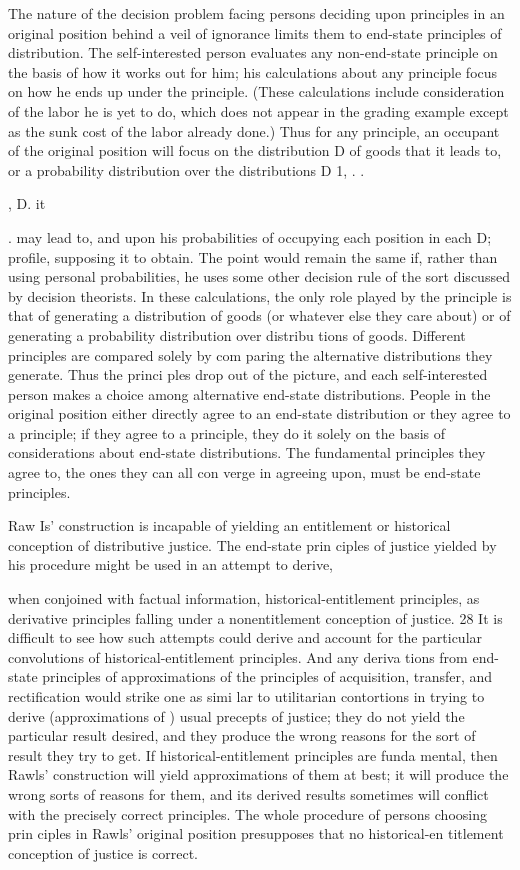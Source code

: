 \documentclass[11pt,openany]{book}
\begin{document}
The nature of the decision problem facing persons deciding upon principles in an original position behind a veil of ignorance limits them to end-state principles of distribution. The self-interested person evaluates any non-end-state principle on the basis of how it works out for him; his calculations about any principle focus on how he ends up under the principle. (These calculations include consideration of the labor he is yet to do, which does not appear in the grading example except as the sunk cost of the labor already done.) Thus for any principle, an occupant of the original position will focus on the distribution D of goods that it leads to, or a probability distribution over the distributions D 1, . . 

, D. it 

. may lead to, and upon his probabilities of occupying each position in each D; profile, supposing it to obtain. The point would remain the same if, rather than using personal probabilities, he uses some other decision rule of the sort discussed by decision theorists. In these calculations, the only role played by the principle is that of generating a distribution of goods (or whatever else they care about) or of generating a probability distribution over distribu tions of goods. Different principles are compared solely by com paring the alternative distributions they generate. Thus the princi ples drop out of the picture, and each self-interested person makes a choice among alternative end-state distributions. People in the original position either directly agree to an end-state distribution or they agree to a principle; if they agree to a principle, they do it solely on the basis of considerations about end-state distributions. The fundamental principles they agree to, the ones they can all con verge in agreeing upon, must be end-state principles. 

Raw Is' construction is incapable of yielding an entitlement or historical conception of distributive justice. The end-state prin ciples of justice yielded by his procedure might be used in an attempt to derive, 

when conjoined with factual information, historical-entitlement principles, as derivative principles falling under a nonentitlement conception of justice. 28 It is difficult to see how such attempts could derive and account for the particular convolutions of historical-entitlement principles. And any deriva tions from end-state principles of approximations of the principles of acquisition, transfer, and rectification would strike one as simi lar to utilitarian contortions in trying to derive (approximations of ) usual precepts of justice; they do not yield the particular result desired, and they produce the wrong reasons for the sort of result they try to get. If historical-entitlement principles are funda mental, then Rawls' construction will yield approximations of them at best; it will produce the wrong sorts of reasons for them, and its derived results sometimes will conflict with the precisely correct principles. The whole procedure of persons choosing prin ciples in Rawls' original position presupposes that no historical-en titlement conception of justice is correct. 
\end{document}
